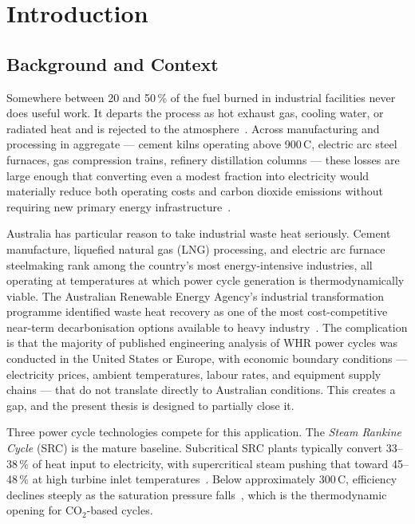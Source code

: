 \documentclass[12pt,a4paper]{report}
\begin{document}
\chapter{Introduction}
\label{ch:introduction}

\section{Background and Context}
\label{sec:background}

Somewhere between 20 and 50\,\% of the fuel burned in industrial facilities
never does useful work. It departs the process as hot exhaust gas, cooling
water, or radiated heat and is rejected to the
atmosphere~\cite{Johnson2008,Papapetrou2018}. Across manufacturing and
processing in aggregate --- cement kilns operating above 900\,\textdegree C,
electric arc steel furnaces, gas compression trains, refinery distillation
columns --- these losses are large enough that converting even a modest
fraction into electricity would materially reduce both operating costs and
carbon dioxide emissions without requiring new primary energy
infrastructure~\cite{Bonilla2015}.

Australia has particular reason to take industrial waste heat seriously. Cement
manufacture, liquefied natural gas (LNG) processing, and electric arc furnace
steelmaking rank among the country's most energy-intensive industries, all
operating at temperatures at which power cycle generation is thermodynamically
viable. The Australian Renewable Energy Agency's industrial transformation
programme identified waste heat recovery as one of the most cost-competitive
near-term decarbonisation options available to heavy
industry~\cite{ARENA2023}. The complication is that the majority of published
engineering analysis of WHR power cycles was conducted in the United States
or Europe, with economic boundary conditions --- electricity prices, ambient
temperatures, labour rates, and equipment supply chains --- that do not
translate directly to Australian conditions. This creates a gap, and the
present thesis is designed to partially close it.

Three power cycle technologies compete for this application. The \textit{Steam
Rankine Cycle} (SRC) is the mature baseline. Subcritical SRC plants typically
convert 33--38\,\% of heat input to electricity, with supercritical steam
pushing that toward 45--48\,\% at high turbine inlet
temperatures~\cite{Tian2022}. Below approximately 300\,\textdegree C,
efficiency declines steeply as the saturation pressure falls~\cite{Tchanche2011},
which is the thermodynamic opening for CO$_2$-based cycles.
\end{document}
